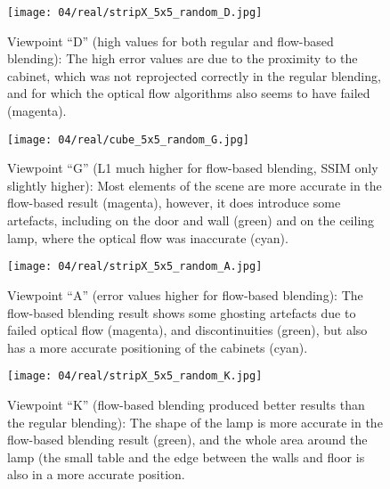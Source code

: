 
\begin{figure}
  \centering
  \texttt{[image: 04/real/stripX\_5x5\_random\_D.jpg]}
  \caption[Viewpoint ``D'' in the real scene]{Viewpoint ``D'' (high values for both regular and flow-based blending): The high error values are due to the proximity to the cabinet, which was not reprojected correctly in the regular blending, and for which the optical flow algorithms also seems to have failed (magenta).}
  \label{fig:real_D}
\end{figure}


\begin{figure}
		\centering
    \texttt{[image: 04/real/cube\_5x5\_random\_G.jpg]}
		\caption[Viewpoint ``G'' in the real scene]{Viewpoint ``G'' (L1 much higher for flow-based blending, SSIM only slightly higher): Most elements of the scene are more accurate in the flow-based result (magenta), however, it does introduce some artefacts, including on the door and wall (green) and on the ceiling lamp, where the optical flow was inaccurate (cyan).}
		\label{fig:real_G}
\end{figure}

\begin{figure}
  \centering
  \texttt{[image: 04/real/stripX\_5x5\_random\_A.jpg]}
  \caption[Viewpoint ``A'' in the real scene]{Viewpoint ``A'' (error values higher for flow-based blending): The flow-based blending result shows some ghosting artefacts due to failed optical flow (magenta), and discontinuities (green), but also has a more accurate positioning of the cabinets (cyan).}
	\label{fig:real_A}
\end{figure}

\begin{figure}
  \centering
  \texttt{[image: 04/real/stripX\_5x5\_random\_K.jpg]}
  \caption[Viewpoint ``K'' in the real scene]{Viewpoint ``K'' (flow-based blending produced better results than the regular blending): The shape of the lamp is more accurate in the flow-based blending result (green), and the whole area around the lamp (the small table and the edge between the walls and floor is also in a more accurate position.}
	\label{fig:real_K}
\end{figure}

